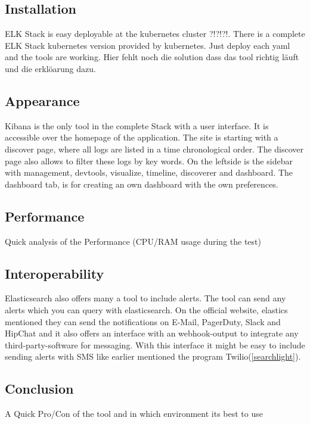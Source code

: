 \subsection{Installation}
ELK Stack is easy deployable at the kubernetes cluster ?!?!?!. There is a complete ELK Stack kubernetes version provided by kubernetes. Just deploy each yaml and the tools are working. Hier fehlt noch die solution dass das tool richtig läuft und die erklöarung dazu.

\subsection{Appearance}%
Kibana is the only tool in the complete Stack with a user interface. It is accessible over the homepage of the application. The site is starting with a discover page, where all logs are listed in a time chronological order. The discover page also allows to filter these logs by key words. On the leftside is the sidebar with management, devtools, visualize, timeline, discoverer and dashboard. The dashboard tab, is for creating an own dashboard with the own preferences.
\subsection{Performance}
Quick analysis of the Performance (CPU/RAM usage during the test)
\subsection{Interoperability}
Elasticsearch also offers many a tool to include alerts. The tool can send any alerts which you can query with elasticsearch. On the official website, elastics mentioned they can send the notifications on E-Mail, PagerDuty, Slack and HipChat and it also offers an interface with an webhook-output to integrate any third-party-software for messaging. With this interface it might be easy to include sending alerts with SMS like earlier mentioned the program Twilio(\ref{searchlight}).
\subsection{Conclusion}
A Quick Pro/Con of the tool and in which environment its best to use

